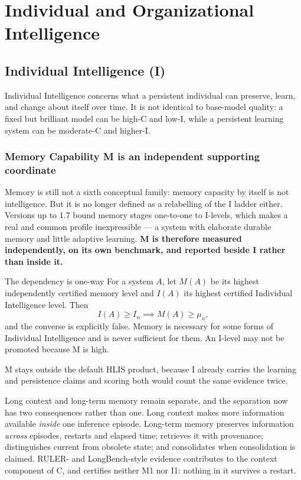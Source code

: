 \documentclass[11pt]{article}
\theoremstyle{definition}
\begin{document}
\section{Individual and Organizational Intelligence}

\subsection{Individual Intelligence (I)}\label{sec:memory}

Individual Intelligence concerns what a persistent individual can preserve, learn, and change about itself over time. It is not identical to base-model quality: a fixed but brilliant model can be high-C and low-I, while a persistent learning system can be moderate-C and higher-I.

\subsubsection{Memory Capability M is an independent supporting coordinate}

Memory is still not a sixth conceptual family: memory capacity by itself is not intelligence. But it is no longer defined as a relabelling of the I ladder either. Versions up to 1.7 bound memory stages one-to-one to I-levels, which makes a real and common profile inexpressible --- a system with elaborate durable memory and little adaptive learning. \textbf{M is therefore measured independently, on its own benchmark, and reported beside I rather than inside it.}

\begin{claimbox}{The dependency is one-way}
For a system $A$, let $M(A)$ be its highest independently certified memory level and $I(A)$ its highest certified Individual Intelligence level. Then
\[ I(A) \ge I_n \implies M(A) \ge \mu_n, \]
and the converse is explicitly false. Memory is necessary for some forms of Individual Intelligence and is never sufficient for them. An I-level may not be promoted because M is high.

M stays outside the default HLIS product, because I already carries the learning and persistence claims and scoring both would count the same evidence twice.
\end{claimbox}

Long context and long-term memory remain separate, and the separation now has two consequences rather than one. Long context makes more information available \emph{inside} one inference episode. Long-term memory preserves information \emph{across} episodes, restarts and elapsed time; retrieves it with provenance; distinguishes current from obsolete state; and consolidates when consolidation is claimed. RULER- and LongBench-style evidence contributes to the context component of C, and certifies neither M1 nor I1: nothing in it survives a restart.
\end{document}
